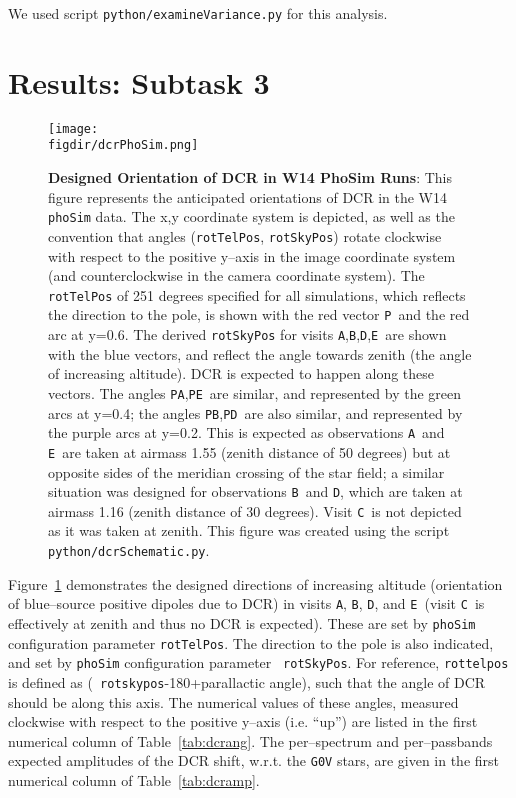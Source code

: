 \documentclass[prd, nofootinbib, floatfix, 11pt, tightenlines, times]{article}
\def\figdir{../figures}
\def\A{{\tt A}}
\def\B{{\tt B}}
\def\C{{\tt C}}
\def\D{{\tt D}}
\def\E{{\tt E}}
\def\P{{\tt P}}
\begin{document}
We used script {\tt python/examineVariance.py} for this analysis.

\section{Results: Subtask 3 \label{sec:task3}}

\begin{figure}[!ht]
  \centering
  \texttt{[image: \\figdir/dcrPhoSim.png]}
  \caption{{\bf Designed Orientation of DCR in W14 PhoSim Runs}: This
    figure represents the anticipated orientations of DCR in the W14
    {\tt phoSim} data.  The x,y coordinate system is depicted, as well
    as the convention that angles ({\tt rotTelPos}, {\tt rotSkyPos})
    rotate clockwise with respect to the positive y--axis in the image
    coordinate system (and counterclockwise in the camera coordinate
    system).  The {\tt rotTelPos} of 251 degrees specified for all
    simulations, which reflects the direction to the pole, is shown
    with the red vector \P\ and the red arc at y=0.6.  The derived
    {\tt rotSkyPos} for visits \A,\B,\D,\E\ are shown with the blue
    vectors, and reflect the angle towards zenith (the angle of
    increasing altitude).  DCR is expected to happen along these
    vectors.  The angles \P\A,\P\E\ are similar, and represented by
    the green arcs at y=0.4; the angles \P\B,\P\D\ are also similar,
    and represented by the purple arcs at y=0.2.  This is expected as
    observations \A\ and \E\ are taken at airmass 1.55 (zenith
    distance of 50 degrees) but at opposite sides of the meridian
    crossing of the star field; a similar situation was designed for
    observations \B\ and \D, which are taken at airmass 1.16 (zenith
    distance of 30 degrees).  Visit \C\ is not depicted as it was
    taken at zenith.  This figure was created using the script {\tt
      python/dcrSchematic.py}.}
  \label{fig:phosimdcr}
\end{figure}

Figure~\ref{fig:phosimdcr} demonstrates the designed directions of
increasing altitude (orientation of blue--source positive dipoles due
to DCR) in visits \A, \B, \D, and \E\ (visit \C\ is effectively at
zenith and thus no DCR is expected).  These are set by {\tt phoSim}
configuration parameter {\tt rotTelPos}.  The direction to the pole is
also indicated, and set by {\tt phoSim} configuration parameter {\tt
  rotSkyPos}.  For reference, {\tt rottelpos} is defined as ({\tt
  rotskypos}-180+parallactic angle), such that the angle of DCR should
be along this axis.  The numerical values of these angles, measured
clockwise with respect to the positive y--axis (i.e. ``up'') are
listed in the first numerical column of Table~\ref{tab:dcrang}.  The
per--spectrum and per--passbands expected amplitudes of the DCR shift,
w.r.t. the {\tt G0V} stars, are given in the first numerical column of
Table~\ref{tab:dcramp}.
\end{document}
